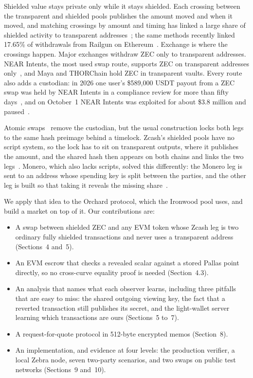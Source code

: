 \documentclass[10pt,letterpaper]{article}
\begin{document}
Shielded value stays private only while it stays shielded. Each crossing between the transparent
and shielded pools publishes the amount moved and when it moved, and matching crossings by amount
and timing has linked a large share of shielded activity to transparent
addresses~\cite{kappos,quesnelle,biryukov}; the same methods recently linked 17.65\% of withdrawals
from Railgun on Ethereum~\cite{railgun}. Exchange is where the crossings happen. Major exchanges
withdraw ZEC only to transparent addresses. NEAR Intents, the most used swap route, supports ZEC on
transparent addresses only~\cite{nearchains}, and Maya and THORChain hold ZEC in transparent
vaults. Every route also adds a custodian: in 2026 one user's \$589{,}000 USDT payout from a ZEC
swap was held by NEAR Intents in a compliance review for more than fifty days~\cite{freeze}, and on
October~1 NEAR Intents was exploited for about \$3.8 million and paused~\cite{nearexploit}.

Atomic swaps~\cite{nolan,herlihy} remove the custodian, but the usual construction locks both legs to
the same hash preimage behind a timelock. Zcash's shielded pools have no script system, so the lock
has to sit on transparent outputs, where it publishes the amount, and the shared hash then appears on
both chains and links the two legs~\cite{xcat}. Monero, which also lacks scripts, solved this
differently: the Monero leg is sent to an address whose spending key is split between the parties,
and the other leg is built so that taking it reveals the missing share~\cite{gugger,athanor}.

We apply that idea to the Orchard protocol, which the Ironwood pool uses, and build a market on top
of it. Our contributions are:
\begin{itemize}\setlength\itemsep{0.1em}
\item A swap between shielded ZEC and any EVM token whose Zcash leg is two ordinary fully shielded
transactions and never uses a transparent address (Sections~4 and~5).
\item An EVM escrow that checks a revealed scalar against a stored Pallas point directly, so no
cross-curve equality proof is needed (Section~4.3).
\item An analysis that names what each observer learns, including three pitfalls that are easy to
miss: the shared outgoing viewing key, the fact that a reverted transaction still publishes its
secret, and the light-wallet server learning which transactions are ours (Sections~5 to~7).
\item A request-for-quote protocol in 512-byte encrypted memos (Section~8).
\item An implementation, and evidence at four levels: the production verifier, a local Zebra node,
seven two-party scenarios, and two swaps on public test networks (Sections~9 and~10).
\end{itemize}
\end{document}
